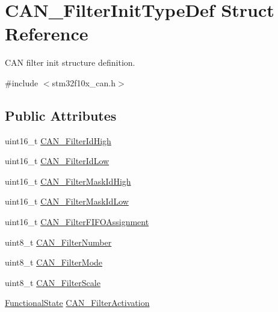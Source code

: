 \hypertarget{struct_c_a_n___filter_init_type_def}{}\section{C\+A\+N\+\_\+\+Filter\+Init\+Type\+Def Struct Reference}
\label{struct_c_a_n___filter_init_type_def}


C\+AN filter init structure definition.  




{\ttfamily \#include $<$stm32f10x\+\_\+can.\+h$>$}

\subsection*{Public Attributes}
\begin{DoxyCompactItemize}
\item 
uint16\+\_\+t \hyperlink{struct_c_a_n___filter_init_type_def_afc109aa8eedced09d296605f2eb871f7}{C\+A\+N\+\_\+\+Filter\+Id\+High}
\item 
uint16\+\_\+t \hyperlink{struct_c_a_n___filter_init_type_def_ab8c56b48ac323e8c7a1b535c79a51f87}{C\+A\+N\+\_\+\+Filter\+Id\+Low}
\item 
uint16\+\_\+t \hyperlink{struct_c_a_n___filter_init_type_def_a6f34539615e6484f266b46aa8f362a91}{C\+A\+N\+\_\+\+Filter\+Mask\+Id\+High}
\item 
uint16\+\_\+t \hyperlink{struct_c_a_n___filter_init_type_def_a0f052daf04b0a481ecfa5c2cc8058089}{C\+A\+N\+\_\+\+Filter\+Mask\+Id\+Low}
\item 
uint16\+\_\+t \hyperlink{struct_c_a_n___filter_init_type_def_a01ba491f12097adcc9f0a3d627628d55}{C\+A\+N\+\_\+\+Filter\+F\+I\+F\+O\+Assignment}
\item 
uint8\+\_\+t \hyperlink{struct_c_a_n___filter_init_type_def_af94466e1138c2b4fe6a67cf556981193}{C\+A\+N\+\_\+\+Filter\+Number}
\item 
uint8\+\_\+t \hyperlink{struct_c_a_n___filter_init_type_def_a7cfb23c48aad13a058c2619dbc062d8a}{C\+A\+N\+\_\+\+Filter\+Mode}
\item 
uint8\+\_\+t \hyperlink{struct_c_a_n___filter_init_type_def_a9d52661aca538dbfcafdda6f16dddc82}{C\+A\+N\+\_\+\+Filter\+Scale}
\item 
\hyperlink{group___exported__types_gac9a7e9a35d2513ec15c3b537aaa4fba1}{Functional\+State} \hyperlink{struct_c_a_n___filter_init_type_def_a0225afda33b565f358ca75bdaa780074}{C\+A\+N\+\_\+\+Filter\+Activation}
\end{DoxyCompactItemize}



